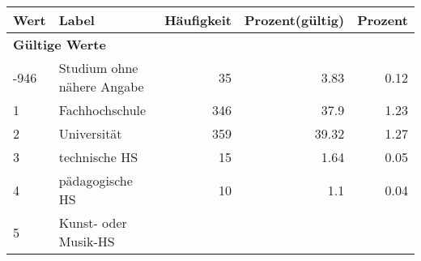      \begin{longtable}{lXrrr}
     \toprule
     \textbf{Wert} & \textbf{Label} & \textbf{Häufigkeit} & \textbf{Prozent(gültig)} & \textbf{Prozent} \\
     \endhead
     \midrule
     \multicolumn{5}{l}{\textbf{Gültige Werte}}\\

     -946 &
     \multicolumn{1}{X}{ Studium ohne nähere Angabe   } &


       \num{35} &
       \num[round-mode=places,round-precision=2]{3.83} &
         \num[round-mode=places,round-precision=2]{0.12} \\

     1 &
     \multicolumn{1}{X}{ Fachhochschule   } &


       \num{346} &
       \num[round-mode=places,round-precision=2]{37.9} &
         \num[round-mode=places,round-precision=2]{1.23} \\

     2 &
     \multicolumn{1}{X}{ Universität   } &


       \num{359} &
       \num[round-mode=places,round-precision=2]{39.32} &
         \num[round-mode=places,round-precision=2]{1.27} \\

     3 &
     \multicolumn{1}{X}{ technische HS   } &


       \num{15} &
       \num[round-mode=places,round-precision=2]{1.64} &
         \num[round-mode=places,round-precision=2]{0.05} \\

     4 &
     \multicolumn{1}{X}{ pädagogische HS   } &


       \num{10} &
       \num[round-mode=places,round-precision=2]{1.1} &
         \num[round-mode=places,round-precision=2]{0.04} \\

     5 &
     \multicolumn{1}{X}{ Kunst- oder Musik-HS   } &



\end{longtable}
